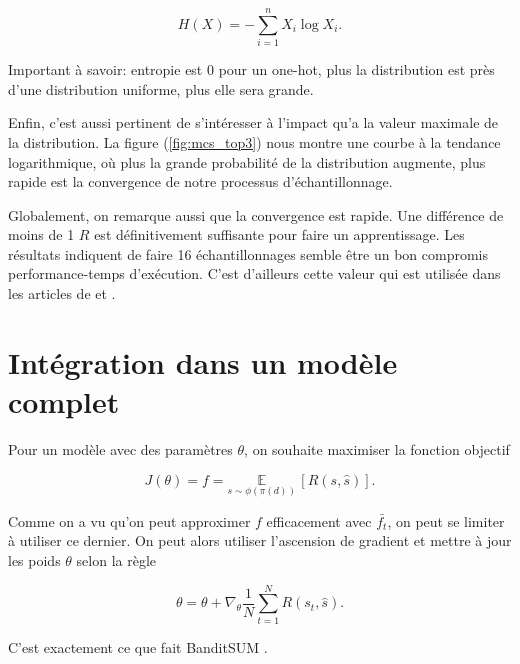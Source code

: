 \begin{equation*}
    H(X) = - \sum_{i=1}^n X_i \log X_i.
\end{equation*}

Important à savoir: entropie est 0 pour un one-hot, plus la distribution est près
d'une distribution uniforme, plus elle sera grande.

Enfin, c'est aussi pertinent de s'intéresser à l'impact qu'a la valeur maximale de
la distribution.
La figure (\ref{fig:mcs_top3}) nous montre une courbe à la tendance logarithmique,
où plus la grande probabilité de la distribution augmente, plus rapide est la convergence
de notre processus d'échantillonnage.

Globalement, on remarque aussi que la convergence est rapide.
Une différence de moins de 1 $R$ est définitivement suffisante pour faire un
apprentissage.
Les résultats indiquent de faire 16 échantillonnages semble être un bon compromis
performance-temps d'exécution.
C'est d'ailleurs cette valeur qui est utilisée dans les articles de \citep{dong2018banditsum}
et \citep{luo-etal-2019-reading}.

\section{Intégration dans un modèle complet}

Pour un modèle avec des paramètres $\theta$, on souhaite maximiser
la fonction objectif

\begin{equation}
    J(\theta) = f = \underset{{s \sim \phi(\pi(d))}}{\mathbb{E}} \,\left[R(s, \hat{s})\right].
\end{equation}

Comme on a vu qu'on peut approximer $f$ efficacement avec $\bar{f_t}$, on peut se limiter
à utiliser ce dernier.
On peut alors utiliser l'ascension de gradient et mettre à jour les poids $\theta$
selon la règle

\begin{equation*}
    \theta = \theta + \nabla_\theta \frac{1}{N} \sum_{t=1}^N R(s_t, \hat{s}).
\end{equation*}

C'est exactement ce que fait BanditSUM \citep{dong2018banditsum}.


